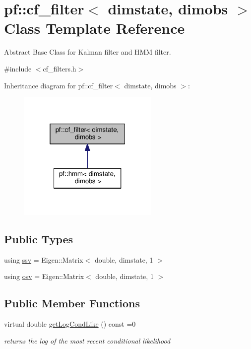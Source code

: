 \hypertarget{classpf_1_1cf__filter}{}\section{pf\+:\+:cf\+\_\+filter$<$ dimstate, dimobs $>$ Class Template Reference}
\label{classpf_1_1cf__filter}


Abstract Base Class for Kalman filter and H\+MM filter.  




{\ttfamily \#include $<$cf\+\_\+filters.\+h$>$}



Inheritance diagram for pf\+:\+:cf\+\_\+filter$<$ dimstate, dimobs $>$\+:
\nopagebreak
\begin{figure}[H]
\begin{center}
\leavevmode
\includegraphics[width=193pt]{classpf_1_1cf__filter__inherit__graph}
\end{center}
\end{figure}
\subsection*{Public Types}
\begin{DoxyCompactItemize}
\item 
using \hyperlink{classpf_1_1cf__filter_a448f675e130ac4b340e2c3e545673d0d}{ssv} = Eigen\+::\+Matrix$<$ double, dimstate, 1 $>$
\item 
using \hyperlink{classpf_1_1cf__filter_ace17376128bb73ee73ff1b5c4972b317}{osv} = Eigen\+::\+Matrix$<$ double, dimstate, 1 $>$
\end{DoxyCompactItemize}
\subsection*{Public Member Functions}
\begin{DoxyCompactItemize}
\item 
virtual double \hyperlink{classpf_1_1cf__filter_ad9bce9703f26f5371973ceef5e253c4b}{get\+Log\+Cond\+Like} () const =0
\begin{DoxyCompactList}\small\item\em returns the log of the most recent conditional likelihood \end{DoxyCompactList}\end{DoxyCompactItemize}


